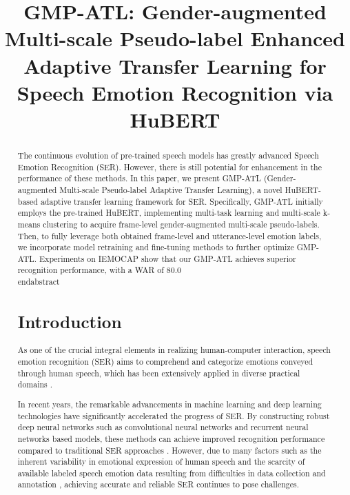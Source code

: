 
\title{GMP-ATL: Gender-augmented Multi-scale Pseudo-label Enhanced Adaptive Transfer Learning for Speech Emotion Recognition via HuBERT}
\maketitle

\begin{abstract}
The continuous evolution of pre-trained speech models has greatly advanced Speech Emotion Recognition (SER). 
However, there is still potential for enhancement in the performance of these methods. 
In this paper, we present GMP-ATL (Gender-augmented Multi-scale Pseudo-label Adaptive Transfer Learning), a novel HuBERT-based adaptive transfer learning framework for SER. 
Specifically, GMP-ATL initially employs the pre-trained HuBERT, implementing multi-task learning and multi-scale k-means clustering to acquire frame-level gender-augmented multi-scale pseudo-labels. 
Then, to fully leverage both obtained frame-level and utterance-level emotion labels, we incorporate model retraining and fine-tuning methods to further optimize GMP-ATL. 
Experiments on IEMOCAP show that our GMP-ATL achieves superior recognition performance, with a WAR of 80.0\\end{abstract}



\section{Introduction}

\noindent
As one of the crucial integral elements in realizing human-computer interaction, speech emotion recognition (SER) aims to comprehend and categorize emotions conveyed through human speech, which has been extensively applied in diverse practical domains \cite{hci,business,healthcare}. 

In recent years, the remarkable advancements in machine learning and deep learning technologies have significantly accelerated the progress of SER.
By constructing robust deep neural networks such as convolutional neural networks and recurrent neural networks \cite{li2019improved,ghriss2022sentiment,TIMNet} based models, these methods can achieve improved recognition performance compared to traditional SER approaches \cite{6023178,1326051,5674019}. 
However, due to many factors such as the inherent variability in emotional expression of human speech \cite{kim2017towards,pan2024msac} and the scarcity of available labeled speech emotion data resulting from difficulties in data collection and annotation \cite{Chen,Gat}, achieving accurate and reliable SER continues to pose challenges.



\end{abstract}
